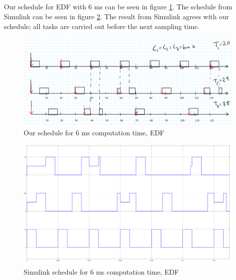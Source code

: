 \documentclass[12pt,a4paper]{article}
\begin{document}
\subsection{} 
Our schedule for EDF with 6 ms can be seen in figure \ref{fig:ex641}. The
schedule from Simulink can be seen in figure \ref{fig:ex642}. The result from
Simulink agrees with our schedule; all tasks are carried out before the
next sampling time.
\begin{center}
	\begin{figure}[H]
      \centering
	\includegraphics[scale=0.5]{ex641.png}
	\caption{Our schedule for 6 ms computation time, EDF}
	\label{fig:ex641}
	\end{figure}
\end{center}
\begin{center}
	\begin{figure}[H]
      \centering
	\includegraphics[scale=0.2]{ex642.png}
	\caption{Simulink schedule for 6 ms computation time, EDF}
	\label{fig:ex642}
	\end{figure}
\end{center}
\end{document}
